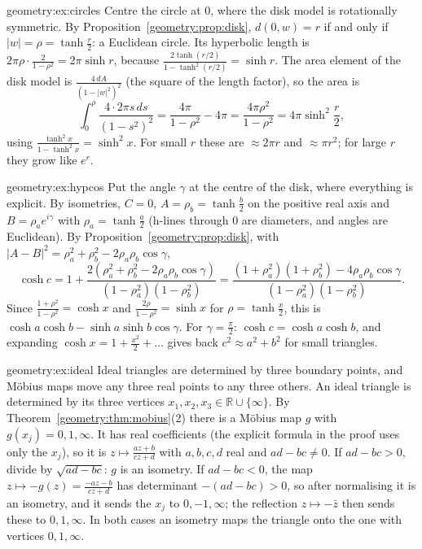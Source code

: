 \begin{solution}{geometry:ex:circles}
\idea Centre the circle at $0$, where the disk model is rotationally symmetric.
\writeup By Proposition~\ref{geometry:prop:disk}, $d(0,w)=r$ if and only if $|w|=\rho=\tanh\frac r2$: a Euclidean circle. Its hyperbolic length is
$2\pi\rho\cdot\frac2{1-\rho^2}=2\pi\sinh r$, because $\frac{2\tanh(r/2)}{1-\tanh^2(r/2)}=\sinh r$. The area element of the disk model is $\frac{4\,dA}{(1-|w|^2)^2}$
(the square of the length factor), so the area is
\[
\int_0^\rho\frac{4\cdot2\pi s\,ds}{(1-s^2)^2}=\frac{4\pi}{1-\rho^2}-4\pi=\frac{4\pi\rho^2}{1-\rho^2}=4\pi\sinh^2\frac r2,
\]
using $\frac{\tanh^2x}{1-\tanh^2x}=\sinh^2x$. For small $r$ these are $\approx2\pi r$ and $\approx\pi r^2$; for large $r$ they grow like $e^r$.
\end{solution}

\begin{solution}{geometry:ex:hypcos}
\idea Put the angle $\gamma$ at the centre of the disk, where everything is explicit.
\writeup By isometries, $C=0$, $A=\rho_b=\tanh\frac b2$ on the positive real axis and $B=\rho_ae^{i\gamma}$ with $\rho_a=\tanh\frac a2$ (h-lines through $0$ are
diameters, and angles are Euclidean). By Proposition~\ref{geometry:prop:disk}, with $|A-B|^2=\rho_a^2+\rho_b^2-2\rho_a\rho_b\cos\gamma$,
\[
\cosh c=1+\frac{2(\rho_a^2+\rho_b^2-2\rho_a\rho_b\cos\gamma)}{(1-\rho_a^2)(1-\rho_b^2)}=\frac{(1+\rho_a^2)(1+\rho_b^2)-4\rho_a\rho_b\cos\gamma}{(1-\rho_a^2)(1-\rho_b^2)}.
\]
Since $\frac{1+\rho^2}{1-\rho^2}=\cosh x$ and $\frac{2\rho}{1-\rho^2}=\sinh x$ for $\rho=\tanh\frac x2$, this is $\cosh a\cosh b-\sinh a\sinh b\cos\gamma$. For
$\gamma=\frac\pi2$: $\cosh c=\cosh a\cosh b$, and expanding $\cosh x=1+\frac{x^2}2+\dots$ gives back $c^2\approx a^2+b^2$ for small triangles.
\end{solution}

\begin{solution}{geometry:ex:ideal}
\idea Ideal triangles are determined by three boundary points, and M\"obius maps move any three real points to any three others.
\writeup An ideal triangle is determined by its three vertices $x_1,x_2,x_3\in\mathbb R\cup\{\infty\}$. By Theorem~\ref{geometry:thm:mobius}(2) there is a M\"obius map
$g$ with $g(x_j)=0,1,\infty$. It has real coefficients (the explicit formula in the proof uses only the $x_j$), so it is $z\mapsto\frac{az+b}{cz+d}$ with
$a,b,c,d$ real and $ad-bc\ne0$. If $ad-bc>0$, divide by $\sqrt{ad-bc}$: $g$ is an isometry. If $ad-bc<0$, the map $z\mapsto-g(z)=\frac{-az-b}{cz+d}$ has determinant $-(ad-bc)>0$, so after normalising it is an isometry, and it sends the $x_j$ to
$0,-1,\infty$; the reflection $z\mapsto-\bar z$ then sends these to $0,1,\infty$. In both cases an isometry maps the triangle onto the one with vertices $0,1,\infty$.
\end{solution}

